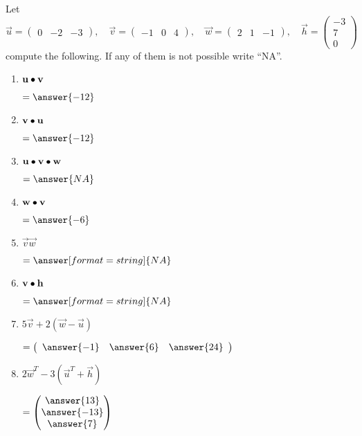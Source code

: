 \documentclass{ximera}
\author{Parisa Fatheddin}
\begin{document}
\begin{exercise}
Let
\[
\vec{u} =
\begin{pmatrix}
0 & -2& -3
\end{pmatrix}
, \quad
\vec{v} = \begin{pmatrix}
  -1 & 0 & 4
\end{pmatrix},
\quad \vec{w} = \begin{pmatrix} 2 & 1 & -1 \end{pmatrix}
, \quad \vec{h} = \begin{pmatrix} -3\\
7\\
0
\end{pmatrix}
\]
compute the following. If any of them is not possible write ``NA''.
\begin{enumerate}
\item $\mathbf{u}\bullet \mathbf{v}$ \begin{prompt}$= \answer{-12}$\end{prompt}
\item $\mathbf{v}\bullet \mathbf{u}$ \begin{prompt}$= \answer{-12}$\end{prompt}
\item $\mathbf{u}\bullet \mathbf{v} \bullet\mathbf{w} $\begin{prompt} $= \answer{NA}$\end{prompt}
\item $\mathbf{w}\bullet \mathbf{v} $\begin{prompt} $=\answer{-6}$\end{prompt}
\item $\vec{v}\vec{w}$ \begin{prompt} $= \answer[format=string]{NA}$\end{prompt}
\item $\mathbf{v} \bullet \mathbf{h}$ \begin{prompt}$= \answer[format=string]{NA}$\end{prompt}
\item $5 \vec{v} + 2\left(\vec{w}-\vec{u}\right)$ \begin{prompt} $= \left(\begin{array}{ccc} \answer{-1} & \answer{6} & \answer{24}\end{array}\right)$ \end{prompt}
\item $2 \vec{w}^{T} - 3\left(\vec{u}^{T} + \vec{h}\right)$\begin{prompt}$= \begin{pmatrix} \answer{13} \\
\answer{-13}\\
\answer{7}
  \end{pmatrix}$\end{prompt}
    \pdfOnly{\end{multicols}}
\end{enumerate}
\end{exercise}
\end{document}
